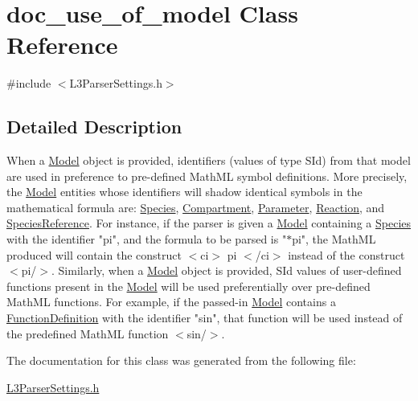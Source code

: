 \hypertarget{classdoc__use__of__model}{}\section{doc\+\_\+use\+\_\+of\+\_\+model Class Reference}
\label{classdoc__use__of__model}


{\ttfamily \#include $<$L3\+Parser\+Settings.\+h$>$}



\subsection{Detailed Description}
\begin{DoxyParagraph}{}
When a \hyperlink{class_model}{Model} object is provided, identifiers (values of type {\ttfamily S\+Id}) from that model are used in preference to pre-\/defined Math\+ML symbol definitions. More precisely, the \hyperlink{class_model}{Model} entities whose identifiers will shadow identical symbols in the mathematical formula are\+: \hyperlink{class_species}{Species}, \hyperlink{class_compartment}{Compartment}, \hyperlink{class_parameter}{Parameter}, \hyperlink{class_reaction}{Reaction}, and \hyperlink{class_species_reference}{Species\+Reference}. For instance, if the parser is given a \hyperlink{class_model}{Model} containing a \hyperlink{class_species}{Species} with the identifier "{\ttfamily pi}", and the formula to be parsed is "{$\ast$pi}", the Math\+ML produced will contain the construct {\ttfamily $<$ci$>$ pi $<$/ci$>$} instead of the construct {\ttfamily $<$pi/$>$}. Similarly, when a \hyperlink{class_model}{Model} object is provided, {\ttfamily S\+Id} values of user-\/defined functions present in the \hyperlink{class_model}{Model} will be used preferentially over pre-\/defined Math\+ML functions. For example, if the passed-\/in \hyperlink{class_model}{Model} contains a \hyperlink{class_function_definition}{Function\+Definition} with the identifier "{\ttfamily sin}", that function will be used instead of the predefined Math\+ML function {\ttfamily $<$sin/$>$}. 
\end{DoxyParagraph}


The documentation for this class was generated from the following file\+:\begin{DoxyCompactItemize}
\item 
\hyperlink{_l3_parser_settings_8h}{L3\+Parser\+Settings.\+h}\end{DoxyCompactItemize}
